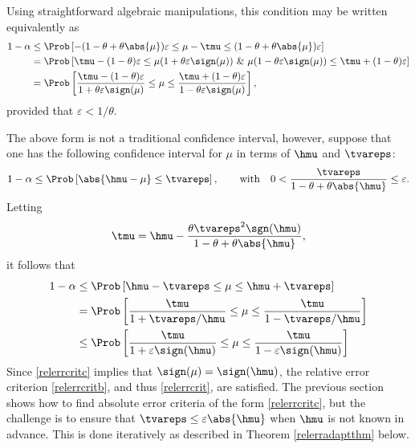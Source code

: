 \documentclass[graybox]{svmult}
\begin{document}
Using straightforward algebraic manipulations, this condition may be written equivalently as 
\begin{align}
\nonumber
1- \alpha & \le \Prob\left[ -(1-\theta + \theta\abs{\mu}) \varepsilon \le \mu - \tmu \le  (1-\theta + \theta\abs{\mu}) \varepsilon \right] \\
\nonumber
& = \Prob\left[ \tmu-(1-\theta)\varepsilon \le \mu(1+\theta\varepsilon\sign(\mu)) \  \& \ \mu(1-\theta\varepsilon\sign(\mu)) \le \tmu + (1-\theta) \varepsilon \right] \\
& = \Prob\left[ \frac{\tmu-(1-\theta)\varepsilon}{1+\theta\varepsilon\sign(\mu)} \le \mu \le \frac{\tmu + (1-\theta) \varepsilon}{1-\theta\varepsilon\sign(\mu)} \right] 
\label{relerrcritb},
\end{align}
provided that $\varepsilon < 1/\theta$.

The above form is not a traditional confidence interval, however, suppose that one has the following confidence interval for $\mu$ in terms of $\hmu$ and $\tvareps$: 
\begin{equation} \label{relerrcritc}
1-\alpha \le \Prob\left[\abs{\hmu-\mu} \le \tvareps \right],\qquad
\text{with} \quad 0 < \frac{\tvareps}{1-\theta + \theta \abs{\hmu}} \le \varepsilon.
\end{equation}
Letting 
\[
\tmu = \hmu - \frac{\theta\tvareps^2\sgn(\hmu)}{1-\theta + \theta \abs{\hmu}}, 
\]
it follows that 
\begin{align*} 
1-\alpha &\le \Prob\left[\hmu -\tvareps \le \mu \le \hmu + \tvareps \right] \\
& =\Prob\left[\frac{\tmu}{1+\tvareps/\hmu} \le \mu \le \frac{\tmu}{1-\tvareps/\hmu} \right] \\
&\le\Prob\left[\frac{\tmu}{1+\varepsilon\sign(\hmu)} \le \mu \le \frac{\tmu}{1-\varepsilon\sign(\hmu)} \right]
\end{align*}
Since \eqref{relerrcritc} implies that $\sign(\mu) = \sign(\hmu)$, the relative error criterion \eqref{relerrcritb}, and thus \eqref{relerrcrit}, are satisfied.  The previous section shows how to find absolute error criteria of the form \eqref{relerrcritc}, but the challenge is to ensure that $\tvareps \le \varepsilon\abs{\hmu}$ when $\hmu$ is not known in advance.  This is done iteratively as described in Theorem \ref{relerradaptthm} below.
\end{document}

